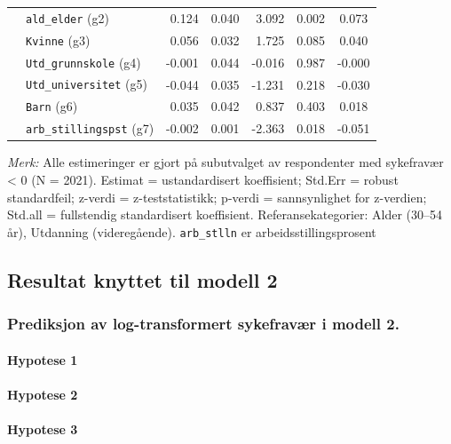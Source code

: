 \documentclass[
  12pt,
  a4paper,
  DIV=11,
  numbers=noendperiod]{scrartcl}
\let\oldparagraph\paragraph
\renewcommand{\paragraph}[1]{\oldparagraph{#1}\mbox{}}
\begin{document}
\begin{table}[htbp]
\begin{tabular}{@{}llrrrrc@{}}
& \texttt{ald\_elder} (g2)        & 0.124 & 0.040 & 3.092  & 0.002  & 0.073 \\
& \texttt{Kvinne} (g3)            & 0.056 & 0.032 & 1.725  & 0.085  & 0.040 \\
& \texttt{Utd\_grunnskole} (g4)   & -0.001& 0.044 & -0.016 & 0.987  & -0.000 \\
& \texttt{Utd\_universitet} (g5)  & -0.044& 0.035 & -1.231 & 0.218  & -0.030 \\
& \texttt{Barn} (g6)              & 0.035 & 0.042 & 0.837  & 0.403  & 0.018 \\
& \texttt{arb\_stillingspst} (g7) & -0.002& 0.001 & -2.363 & 0.018  & -0.051 \\
\bottomrule
\end{tabular}
\footnotesize{%
\textit{Merk:} Alle estimeringer er gjort på subutvalget av respondenter med sykefravær < 0 (N = 2021). Estimat = ustandardisert koeffisient; Std.Err = robust standardfeil; z-verdi = z-teststatistikk; p-verdi = sannsynlighet for z-verdien; Std.all = fullstendig standardisert koeffisient. Referansekategorier: Alder (30–54 år), Utdanning (videregående). \texttt{arb\_stlln} er arbeidsstillingsprosent}
\end{table}

\subsection{Resultat knyttet til modell
2}\label{resultat-knyttet-til-modell-2-1}

\subsubsection{Prediksjon av log-transformert sykefravær i modell
2.}\label{prediksjon-av-log-transformert-sykefravuxe6r-i-modell-2.}

\paragraph{Hypotese 1}\label{hypotese-1}

\paragraph{Hypotese 2}\label{hypotese-2}

\paragraph{Hypotese 3}\label{hypotese-3}
\end{document}
